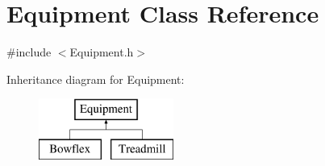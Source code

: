 \hypertarget{class_equipment}{}\section{Equipment Class Reference}
\label{class_equipment}


{\ttfamily \#include $<$Equipment.\+h$>$}

Inheritance diagram for Equipment\+:\begin{figure}[H]
\begin{center}
\leavevmode
\includegraphics[height=2.000000cm]{class_equipment}
\end{center}
\end{figure}
